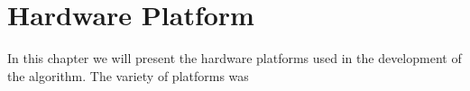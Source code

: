 \normalfont\normalsize
\chapter{Hardware Platform}

In this chapter we will present the hardware platforms used in the development of the algorithm. The variety of platforms was
